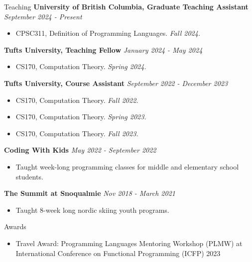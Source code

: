 \documentclass{resume} %
\begin{document}
\begin{rSection}{Teaching}
{\bf University of British Columbia, Graduate Teaching Assistant} \hfill {\em September 2024 - Present}
\begin{itemize}
    \item CPSC311, Definition of Programming Languages. {\it Fall 2024.}
\end{itemize}

{\bf Tufts University, Teaching Fellow} \hfill {\em January 2024 - May 2024}
\begin{itemize}
    \item CS170, Computation Theory. {\it Spring 2024.}
\end{itemize}

{\bf Tufts University, Course Assistant} \hfill {\em September 2022 - December 2023}
\begin{itemize}
    \item CS170, Computation Theory. {\it Fall 2022.}
    \item CS170, Computation Theory. {\it Spring 2023.}
    \item CS170, Computation Theory. {\it Fall 2023.}
\end{itemize}

{\bf Coding With Kids} \hfill {\em May 2022 - September 2022}
\begin{itemize}
    \item Taught week-long programming classes for middle and elementary school students.
\end{itemize}

{\bf The Summit at Snoqualmie} \hfill {\em Nov 2018 - March 2021}
\begin{itemize}
    \item Taught 8-week long nordic skiing youth programs.
\end{itemize}
    
\end{rSection}

\begin{rSection}{Awards}
    \begin{itemize}
        \item Travel Award: Programming Languages Mentoring Workshop (PLMW) at International Conference on Functional Programming (ICFP) 2023
    \end{itemize}
\end{rSection}
\end{document}
